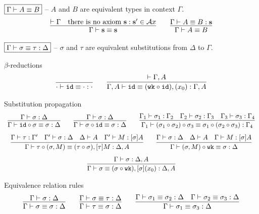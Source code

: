 \noindent
$\boxed{\Gamma \vdash A \equiv B}$ -- $A$ and $B$ are equivalent types in context $\Gamma$.
\[
\begin{array}{c}
  \infer{
    \eqtyp \Gamma {\tmcst s} {\tmcst s}
  }{
    \wfctx \Gamma
    &
    \text{there is no axiom } \tmcst s : \tmcst s' \in \Ax
  }
  \qquad
  \infer{
    \eqtyp \Gamma A B
  }{
    \eqexp \Gamma A B {\tmcst s}
  }
\end{array}
\]

\noindent
$\boxed{\Gamma \vdash \sigma \equiv \tau : \Delta}$ -- $\sigma$ and $\tau$ are equivalent substitutions from $\Delta$ to $\Gamma$.

\noindent
$\beta$-reductions 
\[
\begin{array}{c}
  \infer{
    \eqsub \ctxempty \subid \subempty \ctxempty
  }{
  }
  \qquad
  \infer{
    \eqsub {\ctxext \Gamma A} \subid {\subext {(\subclo \subwk \subid)} {(x_0)}} {\ctxext \Gamma A}
  }{
    \wfctx {\ctxext \Gamma A}
  }
\end{array}
\]

\noindent
Substitution propagation
\[
\begin{array}{c}
  \infer{
    \eqsub \Gamma {\subclo \subid \sigma} \sigma \Delta
  }{
    \wfsub \Gamma \sigma \Delta
  }
  \qquad
  \infer{
    \eqsub \Gamma {\subclo \sigma \subid} \sigma \Delta
  }{
    \wfsub \Gamma \sigma \Delta
  }
  \qquad
  \infer{
    \eqsub {\Gamma_1} {\subclo {(\subclo {\sigma_1} {\sigma_2})} {\sigma_3}} {\subclo {\sigma_1} {(\subclo {\sigma_2} {\sigma_3})}} {\Gamma_4}
  }{
    \wfsub {\Gamma_1} {\sigma_1} {\Gamma_2}
    &
    \wfsub {\Gamma_2} {\sigma_2} {\Gamma_3}
    &
    \wfsub {\Gamma_3} {\sigma_3} {\Gamma_4}
  }
  \\[8pt]
  \infer{
    \eqsub \Gamma {\subclo \tau {(\subext \sigma M)}} {\subext {(\subclo \tau \sigma)} {\tmclo \tau M}} {\ctxext \Delta A}
  }{
    \wfsub \Gamma \tau {\Gamma'}
    &
    \wfsub {\Gamma'} \sigma \Delta
    &
    \wftyp \Delta A
    &
    \wfexp {\Gamma'} M {\tmclo \sigma A}
  }
  \qquad
  \infer{
    \eqsub \Gamma {\subclo {(\subext \sigma M)} {\subwk}} \sigma \Delta
  }{
    \wfsub \Gamma \sigma \Delta
    &
    \wftyp \Delta A
    &
    \wfexp \Gamma M {\tmclo \sigma A}
  }
  \\[8pt]
  \infer{
    \eqsub \Gamma \sigma {\subext {(\subclo \sigma \subwk)} {\tmclo \sigma {(x_0)}}} {\ctxext \Delta A}
  }{
    \wfsub \Gamma \sigma {\ctxext \Delta A}
  }
\end{array}
\]

\noindent
Equivalence relation rules
\[
\begin{array}{c}
  \infer{
    \eqsub \Gamma \sigma \sigma \Delta
  }{
    \wfsub \Gamma \sigma \Delta
  }
  \qquad
  \infer{
    \eqsub \Gamma \tau \sigma \Delta
  }{
    \eqsub \Gamma \sigma \tau \Delta
  }
  \qquad
  \infer{
    \eqsub \Gamma {\sigma_1} {\sigma_3} \Delta
  }{
    \eqsub \Gamma {\sigma_1} {\sigma_2} \Delta
    &
    \eqsub \Gamma {\sigma_2} {\sigma_3} \Delta
  }
\end{array}
\]

